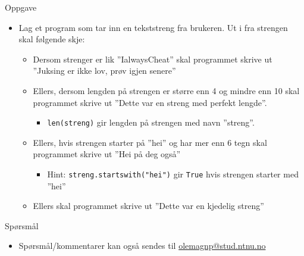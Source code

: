 \documentclass[screen, aspectratio=169]{beamer}
\begin{document}
\begin{frame}[fragile]{Oppgave}
	\begin{itemize}
		\item Lag et program som tar inn en tekststreng fra brukeren. Ut i fra strengen skal følgende skje:
		\begin{itemize}
			\item Dersom strenger er lik ''IalwaysCheat'' skal programmet skrive ut ''Juksing er ikke lov, prøv igjen senere''
			\item Ellers, dersom lengden på strengen er større enn 4 og mindre enn 10 skal programmet skrive ut ''Dette var en streng med perfekt lengde''.
			\begin{itemize}
				\item \lstinline|len(streng)| gir lengden på strengen med navn ''streng''.
			\end{itemize}
			\item Ellers, hvis strengen starter på ''hei'' og har mer enn 6 tegn skal programmet skrive ut ''Hei på deg også''
			\begin{itemize}
				\item Hint: \lstinline|streng.startswith("hei")| gir \lstinline|True| hvis strengen starter med ''hei''
			\end{itemize}
			\item Ellers skal programmet skrive ut ''Dette var en kjedelig streng''
		\end{itemize}
	\end{itemize}
\end{frame}

\begin{frame}{Spørsmål}
	\begin{itemize}
		\item Spørsmål/kommentarer kan også sendes til \href{mailto:olemagnp@stud.ntnu.no}{olemagnp@stud.ntnu.no}
	\end{itemize}
\end{frame}
\end{document}
